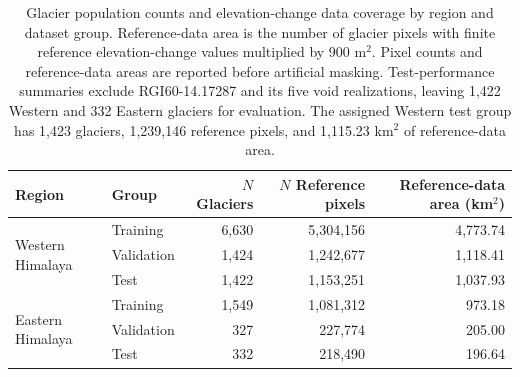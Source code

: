 \begin{table}[!htbp]\centering\small
\caption{Glacier population counts and elevation-change data coverage by region and dataset group. Reference-data area is the number of glacier pixels with finite reference elevation-change values multiplied by 900 m$^2$. Pixel counts and reference-data areas are reported before artificial masking. Test-performance summaries exclude RGI60-14.17287 and its five void realizations, leaving 1,422 Western and 332 Eastern glaciers for evaluation. The assigned Western test group has 1,423 glaciers, 1,239,146 reference pixels, and 1,115.23 km$^2$ of reference-data area.}\label{tab:population}
\begin{tabular}{llrrr}\toprule
Region & Group & $N$ Glaciers & $N$ Reference pixels & Reference-data area (km$^2$)\\\midrule
\multirow{3}{*}{Western Himalaya} & Training & 6,630 & 5,304,156 & 4,773.74\\
 & Validation & 1,424 & 1,242,677 & 1,118.41\\
 & Test & 1,422 & 1,153,251 & 1,037.93\\\midrule
\multirow{3}{*}{Eastern Himalaya} & Training & 1,549 & 1,081,312 & 973.18\\
 & Validation & 327 & 227,774 & 205.00\\
 & Test & 332 & 218,490 & 196.64\\
\bottomrule\end{tabular}\end{table}
